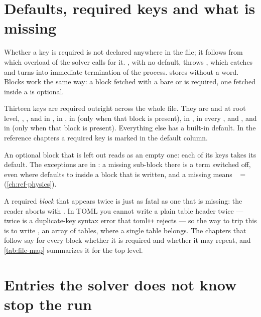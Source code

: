 \section{Defaults, required keys and what is missing}
\label{sec:inputformat:defaults}

Whether a key is required is not declared anywhere in the file; it follows
from which overload of  the solver calls for it.
, with no default, throws , which
 catches and turns into immediate termination of the
process.  stores  without a word. Blocks
work the same way: a block fetched with a bare  or
 is required, one fetched inside a
 is optional.

Thirteen keys are required outright across the whole file. They are 
and  at root level, , ,  and
 in ,  in ,
 in  (only when that block is present),
 in ,  in every
, and ,  and 
in  (only when that block is present). Everything else has a built-in default. In the
reference chapters a required key is marked \reqd{} in the default column.

An optional block that is left out reads as an empty one: each of its keys
takes its default. The exceptions are in : a missing sub-block
there is a term switched off, even where  defaults to
 inside a block that is written, and a missing
 means ~$=$~
(\cref{ch:ref-physics}).

A required \emph{block} that appears twice is just as fatal as one that is
missing: the reader aborts with . In TOML
you cannot write a plain table header twice --- \code{[Grid]} twice is a
duplicate-key syntax error that toml\texttt{++} rejects --- so the way to trip
this is to write \code{[[Grid]]}, an array of tables, where a single table
belongs. The chapters that follow say for every block whether it is required
and whether it may repeat, and \cref{tab:file-map} summarizes it for the top
level.

\section{Entries the solver does not know stop the run}
\label{sec:inputformat:unknown}

